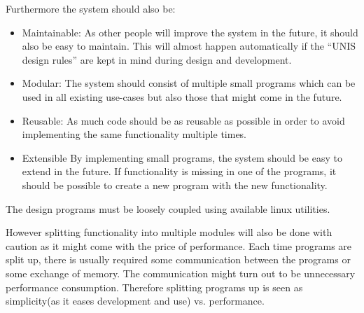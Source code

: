 
Furthermore the system should also be:

\begin{itemize}
	\item Maintainable:
As other people will improve the system in the future, it should also be easy to maintain. This will almost happen automatically if the ``UNIS design rules'' are kept in mind during design and development.
\item Modular:
The system should consist of multiple small programs which can be used in all existing use-cases but also those that might come in the future.
\item Reusable:
As much code should be as reusable as possible in order to avoid implementing the same functionality multiple times.
\item Extensible
    By implementing small programs, the system should be easy to extend in the future.
    If functionality is missing in one of the programs, it should be possible to create a new 
    program with the new functionality.
\end{itemize}


The design programs must be loosely coupled using available linux utilities.


However splitting functionality into multiple modules will also be done with caution as it might come with the price of performance. Each time programs are split up, there is usually required some communication between the programs or some exchange of memory. The communication might turn out to be unnecessary performance consumption. Therefore splitting programs up is seen as simplicity(as it eases development and use) vs. performance.


